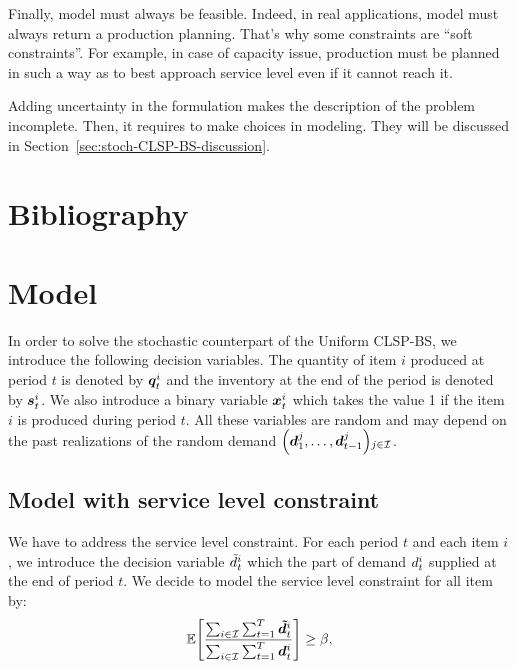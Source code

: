 Finally, model must always be feasible. Indeed, in real applications, model must always return a production planning. That's why some constraints are ``soft constraints''. For example, in case of capacity issue, production must be planned in such a way as to best approach service level even if it cannot reach it.


\medskip

Adding uncertainty in the formulation makes the description of the problem incomplete. Then, it requires to make choices in modeling. They will be discussed in Section~\ref{sec:stoch-CLSP-BS-discussion}.


\section{Bibliography}



\section{Model}
\label{sec:PDP:stochastic:model}

In order to solve the stochastic counterpart of the Uniform CLSP-BS, we introduce the following decision variables. The quantity of item $i$ produced at period $t$ is denoted by $\va\quantity_t^i$ and the inventory at the end of the period is denoted by $\va\inventory_t^i$. We also introduce a binary variable $\va\setup_t^i$ which takes the value 1 if the item $i$ is produced during period $t$. All these variables are random and may depend on the past realizations of the random demand $\bracket{\va\demand_1^j,\ldots,\va\demand_{t-1}^j}_{j\in\REF}$.


\subsection{Model with service level constraint}

We have to address the service level constraint. For each period $t$ and each item $i$, we introduce the decision variable $\tilde{d}_t^i$ which the part of demand $d_t^i$ supplied at the end of period $t$. We decide to model the service level constraint for all item by:
\begin{equation}
  \label{eq:service-level-constraint}
  \espe\sqbracket{ \frac{\sum_{i\in\REF}\sum_{t=1}^{\horizon}\va\supplied_t^i}{\sum_{i\in\REF}\sum_{t=1}^{\horizon}\va\demand_t^i} }
  \geq \servicelvl ,
\end{equation}

